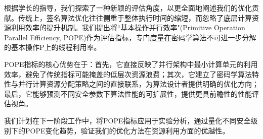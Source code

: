 \documentclass{article}
\begin{document}
根据学长的指导，我们探索了一种新颖的评估角度，以更全面地阐述我们的优化贡献。传统上，签名算法优化往往侧重于整体执行时间的缩短，而忽略了底层计算资源利用效率的提升机制。我们提出将``基本操作并行效率"(Primitive Operation Parallel Efficiency, POPE)作为评估指标，专门度量在密码学算法不可进一步分解的基本操作P上的线程利用率。

POPE指标的核心优势在于：首先，它直接反映了并行架构中最小计算单元的利用效率，避免了传统指标可能掩盖的低层次资源浪费；其次，它建立了密码学算法特性与并行计算资源分配策略之间的直接联系，为算法设计者提供明确的优化方向；最后，它能够预测不同安全参数下算法性能的可扩展性，提供更具前瞻性的性能评估视角。

我们计划在下一阶段工作中，将POPE指标应用于实验分析，通过量化不同安全级别下的POPE变化趋势，验证我们的优化方法在资源利用方面的优越性。

\end{document}
